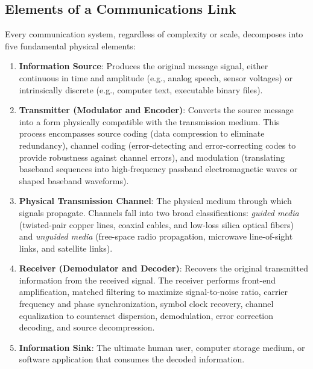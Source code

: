 \documentclass[10pt,twocolumn]{article}
\begin{document}
\subsection{Elements of a Communications Link}
Every communication system, regardless of complexity or scale, decomposes into five fundamental physical elements:
\begin{enumerate}
    \item \textbf{Information Source}: Produces the original message signal, either continuous in time and amplitude (e.g., analog speech, sensor voltages) or intrinsically discrete (e.g., computer text, executable binary files).
    \item \textbf{Transmitter (Modulator and Encoder)}: Converts the source message into a form physically compatible with the transmission medium. This process encompasses source coding (data compression to eliminate redundancy), channel coding (error-detecting and error-correcting codes to provide robustness against channel errors), and modulation (translating baseband sequences into high-frequency passband electromagnetic waves or shaped baseband waveforms).
    \item \textbf{Physical Transmission Channel}: The physical medium through which signals propagate. Channels fall into two broad classifications: \textit{guided media} (twisted-pair copper lines, coaxial cables, and low-loss silica optical fibers) and \textit{unguided media} (free-space radio propagation, microwave line-of-sight links, and satellite links). 
    \item \textbf{Receiver (Demodulator and Decoder)}: Recovers the original transmitted information from the received signal. The receiver performs front-end amplification, matched filtering to maximize signal-to-noise ratio, carrier frequency and phase synchronization, symbol clock recovery, channel equalization to counteract dispersion, demodulation, error correction decoding, and source decompression.
    \item \textbf{Information Sink}: The ultimate human user, computer storage medium, or software application that consumes the decoded information.
\end{enumerate}
\end{document}
